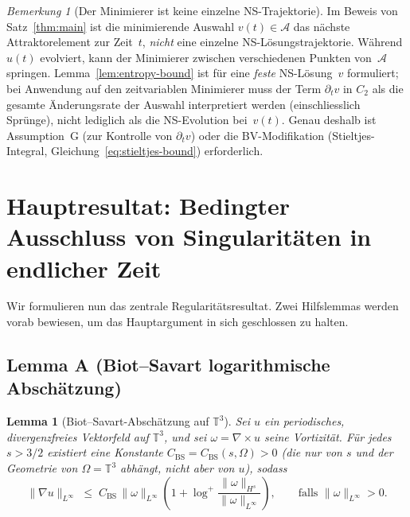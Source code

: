 \documentclass[12pt,a4paper]{article}
\theoremstyle{definition}
\theoremstyle{plain}
\newtheorem{lemma}[definition]{Lemma}
\theoremstyle{remark}
\newtheorem{remark}[definition]{Bemerkung}
\begin{document}
\begin{remark}[Der Minimierer ist keine einzelne NS-Trajektorie]
\label{rem:minimiser-trajectory}
Im Beweis von Satz~\ref{thm:main} ist die minimierende Auswahl
$v(t) \in \mathcal{A}$ das nächste Attraktorelement zur Zeit~$t$,
\emph{nicht} eine einzelne NS-Lösungstrajektorie. Während $u(t)$ evolviert,
kann der Minimierer zwischen verschiedenen Punkten von~$\mathcal{A}$ springen.
Lemma~\ref{lem:entropy-bound} ist für eine \emph{feste} NS-Lösung~$v$
formuliert; bei Anwendung auf den zeitvariablen Minimierer muss der Term
$\partial_t v$ in $C_2$ als die gesamte Änderungsrate der Auswahl
interpretiert werden (einschliesslich Sprünge), nicht lediglich als die
NS-Evolution bei~$v(t)$. Genau deshalb ist Assumption~G (zur Kontrolle
von $\partial_t v$) oder die BV-Modifikation (Stieltjes-Integral,
Gleichung~\eqref{eq:stieltjes-bound}) erforderlich.
\end{remark}

\section{Hauptresultat: Bedingter Ausschluss von Singularitäten in endlicher Zeit}

Wir formulieren nun das zentrale Regularitätsresultat. Zwei Hilfslemmas werden
vorab bewiesen, um das Hauptargument in sich geschlossen zu halten.

\subsection*{Lemma A (Biot--Savart logarithmische Abschätzung)}
\begin{lemma}[Biot--Savart-Abschätzung auf $\mathbb{T}^3$]
\label{lem:BS}
Sei $u$ ein periodisches, divergenzfreies Vektorfeld auf $\mathbb{T}^3$, und sei
$\omega = \nabla\times u$ seine Vortizität. Für jedes $s > 3/2$ existiert eine
Konstante $C_{\mathrm{BS}} = C_{\mathrm{BS}}(s,\Omega) > 0$ (die nur von
$s$ und der Geometrie von $\Omega = \mathbb{T}^3$ abhängt, \emph{nicht} aber von $u$), sodass
\begin{equation}\label{eq:BS}
    \|\nabla u\|_{L^\infty}
    \;\le\;
    C_{\mathrm{BS}}\,\|\omega\|_{L^\infty}
    \!\left(1 + \log^+\!\frac{\|\omega\|_{H^s}}{\|\omega\|_{L^\infty}}\right),
    \qquad \text{falls } \|\omega\|_{L^\infty} > 0.
\end{equation}
\end{lemma}
\end{document}
